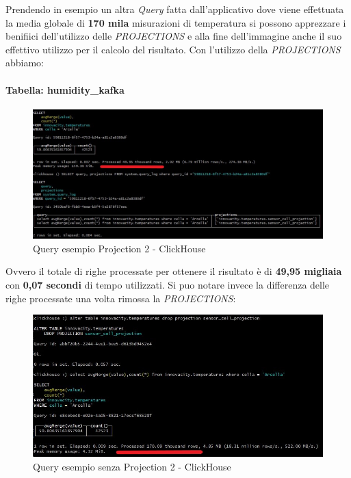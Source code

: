 Prendendo in esempio un altra \textit{Query} fatta dall'applicativo dove viene effettuata la media globale di \textbf{170 mila }misurazioni di temperatura si possono apprezzare i benifiici dell'utilizzo delle \textit{PROJECTIONS} e alla fine dell'immagine anche il suo effettivo utilizzo per il calcolo del risultato.
Con l'utilizzo della \textit{PROJECTIONS} abbiamo:
\paragraph{Tabella: humidity\_kafka}
\begin{figure}[H]
    \centering
    \includegraphics[width=1\textwidth]{../Images/SpecificaTecnica/query2ProjectionsWith.jpg}
    \caption{Query esempio Projection 2 - ClickHouse}
    \label{fig:with2proj}
  \end{figure}
Ovvero il totale di righe processate per ottenere il risultato è di \textbf{49,95 migliaia} con \textbf{0,07 secondi} di tempo utilizzati.
Si puo notare invece la differenza delle righe processate una volta rimossa la \textit{PROJECTIONS}:
\begin{figure}[H]
    \centering
    \includegraphics[width=1\textwidth]{../Images/SpecificaTecnica/query2ProjectionsWithout.jpg}
    \caption{Query esempio senza Projection 2 - ClickHouse}
    \label{fig:without2proj}
  \end{figure}

